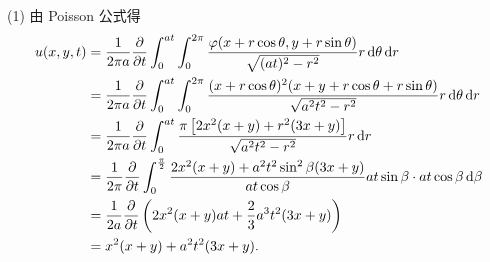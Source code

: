 \begin{solve}
  (1) 由 Poisson 公式得
  \begin{align*}
    u(x,y,t)
    & = \frac{1}{2\pi a}\frac{\partial}{\partial t}\int_0^{at}\int_0^{2\pi}\frac{\varphi(x         
      + r\cos\theta,y+r\sin\theta)}{\sqrt{(at)^2-r^2}}r\mathop{}\!\mathrm{d}\theta\mathop{}\!\mathrm{d} r \\
    & = \frac{1}{2\pi a}\frac{\partial}{\partial t}\int_0^{at}
      \int_0^{2\pi}\frac{(x+r\cos\theta)^2
      (x+y+r\cos\theta+r\sin\theta)}{\sqrt{a^2t^2-r^2}}r\mathop{}\!\mathrm{d}\theta\mathop{}\!\mathrm{d} r \\
    & = \frac{1}{2\pi a}\frac{\partial}{\partial t}
      \int_0^{at}\frac{\pi\left[2x^2(x+y)+r^2(3x+y)\right]}{\sqrt{a^2t^2-r^2}}r\mathop{}\!\mathrm{d} r \\
    & = \frac{1}{2\pi}\frac{\partial}{\partial t}\int_0^{\frac{\pi}{2}}
      \frac{2x^2(x+y)+a^2t^2\sin^2\beta(3x+y)}{at\cos\beta}
      at\sin\beta\cdot at\cos\beta \mathop{}\!\mathrm{d}\beta \\
    & = \frac{1}{2a}\frac{\partial}{\partial t}\left(2x^2(x+y)at+\frac{2}{3}a^3t^2(3x+y)\right)\\
    & = x^2(x+y)+a^2t^2(3x+y).
  \end{align*}


\end{solve}
